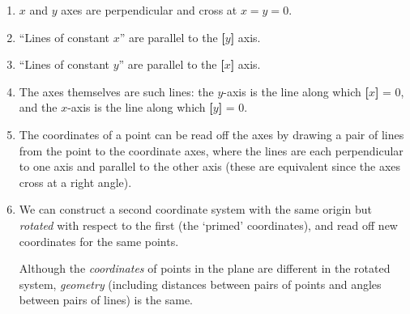 \documentclass[11pt, letterpaper, openany]{book}
\begin{document}
\begin{center}
\end{center}

\begin{enumerate}[label=(\alph*)]
    \item $x$ and $y$ axes are perpendicular and cross at $x=y=0$.
    \item ``Lines of constant $x$'' are parallel to the \textbf{[$y$]} axis.
    \item ``Lines of constant $y$'' are parallel to the \textbf{[$x$]} axis.
    \item The axes themselves are such lines: the $y$-axis is the line along which \textbf{[$x$]} = 0, and the $x$-axis is the line along which \textbf{[$y$]} = 0.
    \item The coordinates of a point can be read off the axes by drawing a pair of lines from the point to the coordinate axes, where the lines are each perpendicular to one axis and parallel to the other axis (these are equivalent since the axes cross at a right angle).
    \item We can construct a second coordinate system with the same origin but \textit{rotated} with respect to the first (the `primed' coordinates), and read off new coordinates for the same points.
    
    Although the \textit{coordinates} of points in the plane are different in the rotated system, \textit{geometry} (including distances between pairs of points and angles between pairs of lines) is the same.
\end{enumerate}
\end{document}
